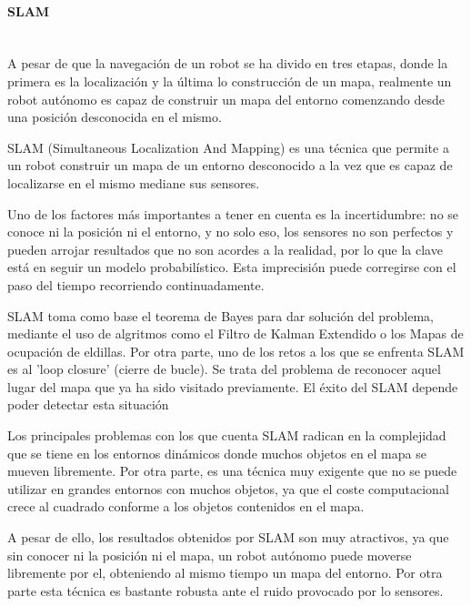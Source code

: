 \paragraph{SLAM} \hspace{0pt} \\
A pesar de que la navegación de un robot se ha divido en tres etapas, donde la
primera es la localización y la última lo construcción de un mapa, realmente un
robot autónomo es capaz de construir un mapa del entorno comenzando desde una
posición desconocida en el mismo.

SLAM (Simultaneous Localization And Mapping) es una técnica que permite a un
robot construir un mapa de un entorno desconocido a la vez que es capaz de
localizarse en el mismo mediane sus sensores. 

Uno de los factores más importantes a tener en cuenta es la incertidumbre: no se
conoce ni la posición ni el entorno, y no solo eso, los sensores no son
perfectos y pueden arrojar resultados que no son acordes a la realidad,  por lo
que la clave está en seguir un modelo probabilístico. Esta imprecisión puede
corregirse con el paso del tiempo recorriendo continuadamente.


SLAM toma como base el teorema de Bayes para dar solución del problema, mediante
el uso de algritmos como el Filtro de Kalman Extendido o los Mapas de ocupación
de eldillas. Por otra parte, uno de los retos a los que se enfrenta SLAM es al
'loop closure' (cierre de bucle). Se trata del problema de reconocer aquel lugar
del mapa que ya ha sido visitado previamente. El éxito del SLAM depende poder
detectar esta situación

Los principales problemas con los que cuenta SLAM radican en la complejidad que
se tiene en los entornos dinámicos donde muchos objetos en el mapa se mueven
libremente. Por otra parte, es una técnica muy exigente que no se puede utilizar
en grandes entornos con muchos objetos, ya que el coste computacional crece al
cuadrado conforme a los objetos contenidos en el mapa.

A pesar de ello, los resultados obtenidos por SLAM son muy atractivos, ya que
sin conocer ni la posición ni el mapa, un robot autónomo puede moverse
libremente por el, obteniendo al mismo tiempo un mapa del entorno. Por otra
parte esta técnica es bastante robusta ante el ruido provocado por lo sensores.

